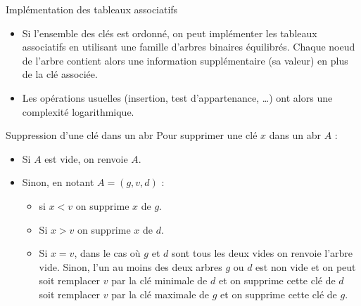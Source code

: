 \documentclass[10pt]{beamer}
\begin{document}
\begin{frame}[fragile]{\Ctitle}{\stitle}
	\begin{block}{Implémentation des tableaux associatifs}
		\begin{itemize}
			\item<1-> Si l'ensemble des clés est ordonné, on peut implémenter les tableaux associatifs en utilisant une famille d'arbres binaires équilibrés. Chaque noeud de l'arbre contient alors une information supplémentaire (sa valeur) en plus de la clé associée.
			\item<2-> Les opérations usuelles (insertion, test d'appartenance, \dots) ont alors une complexité logarithmique.
		\end{itemize}
	\end{block}
\end{frame}

\begin{frame}[fragile]{\Ctitle}{\stitle}
	\begin{block}{Suppression d'une clé dans un {\sc abr}}
		Pour supprimer une clé $x$ dans un {\sc abr} $A$ :
		\begin{itemize}
			\item<3-> Si $A$ est vide, on renvoie $A$.
			\item<4-> Sinon, en notant $A=(g, v, d)$ :
				\begin{itemize}
					\item<4->si $x<v$ on supprime $x$ de $g$.
					\item<5-> Si $x>v$ on supprime $x$ de $d$.
					\item<6-> Si $x=v$, dans le cas où $g$ et $d$ sont tous les deux vides on renvoie l'arbre vide. Sinon,  l'un au moins des deux arbres $g$ ou $d$ est non vide et on peut soit remplacer $v$ par la clé minimale de $d$ et on supprime cette clé de $d$ soit remplacer $v$ par la clé maximale de $g$ et on supprime cette clé de $g$.
				\end{itemize}
		\end{itemize}
	\end{block}
\end{frame}
\end{document}
